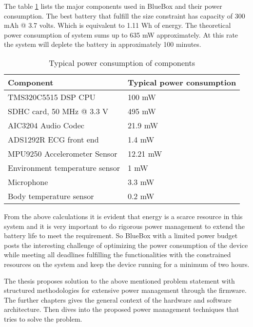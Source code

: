 The table \ref{table:power_rating} lists the major components used in BlueBox and their power consumption. The best battery that fulfill the size constraint has capacity of 300 mAh @ 3.7 volts. Which is equivalent to 1.11 Wh of energy. The theoretical power consumption of system sums up to 635 mW approximately. At this rate the system will deplete the battery in approximately 100 minutes. 
\begin{table}[h]
	\centering
	\begin{tabular}{|l|l|}
		\hline
		Component & Typical power consumption\\
		\hline
		TMS320C5515 DSP CPU &  100 mW \\
		SDHC card, 50 MHz @ 3.3 V   &  495 mW \\
		AIC3204 Audio Codec  &  21.9 mW \\	
		ADS1292R ECG front end & 1.4 mW \\
		MPU9250 Accelerometer Sensor &  12.21 mW \\
		Environment temperature sensor  &  1 mW \\
		Microphone  & 3.3 mW \\
		Body temperature sensor  &  0.2 mW \\	
		\hline
	\end{tabular}
	\caption{Typical power consumption of components}
	\label{table:power_rating}
\end{table}
\vspace*{-2mm}

From the above calculations it is evident that energy is a scarce resource in this system and it is very important to do rigorous power management to extend the battery life to meet the requirement. So BlueBox with a limited power budget posts the interesting challenge of optimizing the power consumption of the device while meeting all deadlines fulfilling the functionalities with the constrained resources on the system and keep the device running for a minimum of two hours.

The thesis proposes solution to the above mentioned problem statement with structured methodologies for extensive power management through the firmware. The further chapters gives the general context of the hardware and software architecture. Then dives into the proposed power management techniques that tries to solve the problem.

